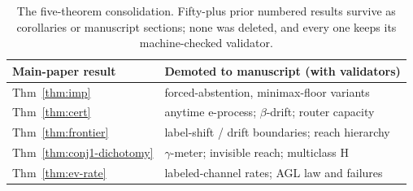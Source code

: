 \smallskip
\begin{table}[t]\centering\small
\begin{tabular}{ll}
\hline
Main-paper result & Demoted to manuscript (with validators) \\
\hline
Thm~\ref{thm:imp} & forced-abstention, minimax-floor variants \\
Thm~\ref{thm:cert} & anytime e-process; $\beta$-drift; router capacity \\
Thm~\ref{thm:frontier} & label-shift / drift boundaries; reach hierarchy \\
Thm~\ref{thm:conj1-dichotomy} & $\gamma$-meter; invisible reach; multiclass H \\
Thm~\ref{thm:ev-rate} & labeled-channel rates; AGL law and failures \\
\hline
\end{tabular}
\caption{The five-theorem consolidation. Fifty-plus prior numbered results survive as
corollaries or manuscript sections; none was deleted, and every one keeps its
machine-checked validator.}
\label{tab:consolidation}
\end{table}

